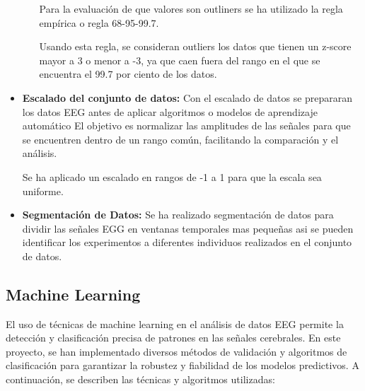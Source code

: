 \begin{itemize}
\begin{itemize}
	
	Para la evaluación de que valores son outliners se ha utilizado la regla empírica o regla
	68-95-99.7.~\cite{outliners:empirica}

Usando esta regla, se consideran outliers los datos que tienen un z-score mayor a 3 o menor a -3, ya que caen fuera del rango en el que se encuentra el 99.7 por ciento de los datos.
	\end{itemize}

	\item
	\textbf{Escalado del conjunto de datos:}	
	Con el escalado de datos se prepararan los datos EEG antes de aplicar algoritmos o modelos de aprendizaje automático El objetivo es normalizar las amplitudes de las señales para que se encuentren dentro de un rango común, facilitando la comparación y el análisis.

Se ha aplicado un escalado en rangos de -1 a 1 para que la escala sea uniforme.

 
	\item
	\textbf{Segmentación de Datos:}	
	Se ha realizado segmentación de datos para dividir las señales EGG en ventanas temporales mas pequeñas asi se pueden identificar los experimentos a diferentes individuos realizados en el conjunto de datos.

\end{itemize}

\subsection{Machine Learning}

El uso de técnicas de machine learning en el análisis de datos EEG permite la detección y clasificación precisa de patrones en las señales cerebrales. En este proyecto, se han implementado diversos métodos de validación y algoritmos de clasificación para garantizar la robustez y fiabilidad de los modelos predictivos. A continuación, se describen las técnicas y algoritmos utilizadas:


